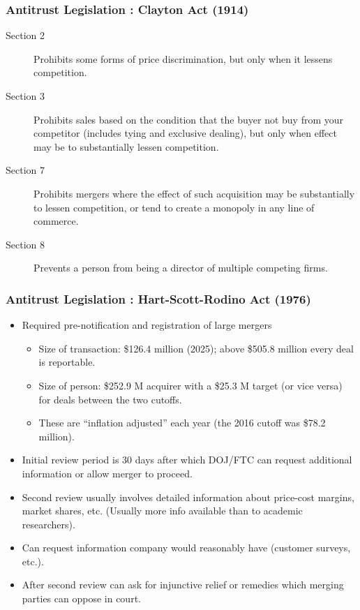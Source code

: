 \documentclass[aspectratio=169,10pt]{beamer}
\begin{document}
\begin{frame}
\frametitle{Antitrust Legislation : Clayton Act (1914)}
 \begin{description}
\item [Section 2] Prohibits some forms of price discrimination, but only when it lessens competition.
\item [Section 3] Prohibits sales based on the condition that the buyer not buy from your competitor (includes tying and exclusive dealing), but only when effect may be to substantially lessen competition.
\item [Section 7] Prohibits mergers where the effect of such acquisition may be substantially to lessen competition, or tend to create a monopoly in any line of commerce.
\item [Section 8] Prevents a person from being a director of multiple competing firms.
 \end{description}
\end{frame}

\begin{frame}
\frametitle{Antitrust Legislation : Hart-Scott-Rodino Act (1976)}
 \begin{itemize}
\item Required pre-notification and registration of large mergers
\begin{itemize}
\item Size of transaction: \$126.4 million (2025); above \$505.8 million every deal is reportable.
\item Size of person: \$252.9 M acquirer with a \$25.3 M target (or vice versa) for deals between the two cutoffs.
\item These are ``inflation adjusted'' each year (the 2016 cutoff was \$78.2 million).
\end{itemize}
\item Initial review period is 30 days after which DOJ/FTC can request additional information or allow merger to proceed.
\item Second review usually involves detailed information about  price-cost margins, market shares, etc. (Usually more info available than to academic researchers).
\item Can request information company would reasonably have (customer surveys, etc.).
\item After second review can ask for \alert{injunctive relief} or \alert{remedies} which merging parties can oppose in court.
 \end{itemize}
\end{frame}
\end{document}
